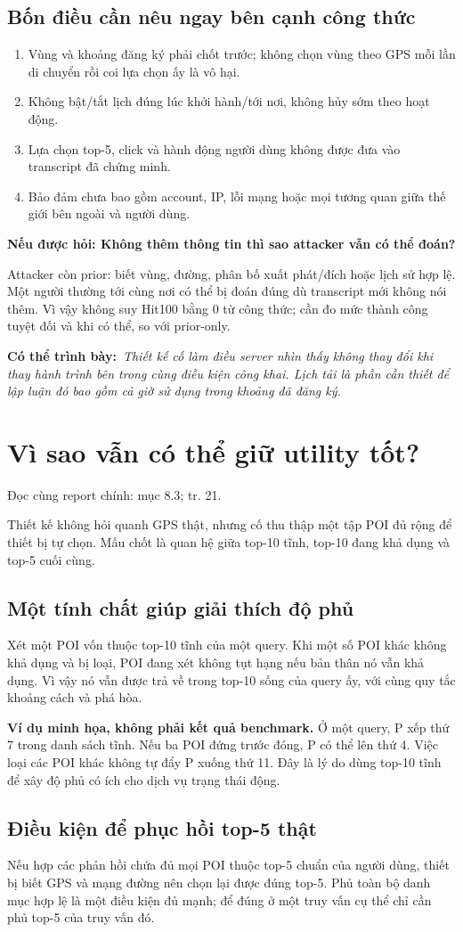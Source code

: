 \documentclass[10pt,a4paper]{article}
\newcommand{\say}[1]{\par\textbf{Có thể trình bày:}\ \textit{#1}\par}
\newcommand{\ask}[2]{\par\textbf{Nếu được hỏi: #1}\par #2\par}
\newcommand{\where}[1]{\par{\small\color{gray}Đọc cùng report chính: #1.}\par}
\newcommand{\example}{\textbf{Ví dụ minh họa, không phải kết quả benchmark.} }
\newcommand{\guidepage}[1]{\clearpage\section{#1}}
\begin{document}
\subsection*{Bốn điều cần nêu ngay bên cạnh công thức}
\begin{enumerate}
\item Vùng và khoảng đăng ký phải chốt trước; không chọn vùng theo GPS mỗi lần di chuyển rồi coi lựa chọn ấy là vô hại.
\item Không bật/tắt lịch đúng lúc khởi hành/tới nơi, không hủy sớm theo hoạt động.
\item Lựa chọn top-5, click và hành động người dùng không được đưa vào transcript đã chứng minh.
\item Bảo đảm chưa bao gồm account, IP, lỗi mạng hoặc mọi tương quan giữa thế giới bên ngoài và người dùng.
\end{enumerate}

\ask{Không thêm thông tin thì sao attacker vẫn có thể đoán?}{Attacker còn prior: biết vùng, đường, phân bố xuất phát/đích hoặc lịch sử hợp lệ. Một người thường tới cùng nơi có thể bị đoán đúng dù transcript mới không nói thêm. Vì vậy không suy Hit100 bằng 0 từ công thức; cần đo mức thành công tuyệt đối và khi có thể, so với prior-only.}
\say{Thiết kế cố làm điều server nhìn thấy không thay đổi khi thay hành trình bên trong cùng điều kiện công khai. Lịch tải là phần cần thiết để lập luận đó bao gồm cả giờ sử dụng trong khoảng đã đăng ký.}

\guidepage{Vì sao vẫn có thể giữ utility tốt?}
\where{mục 8.3; tr. 21}
Thiết kế không hỏi quanh GPS thật, nhưng cố thu thập một tập POI đủ rộng để thiết bị tự chọn. Mấu chốt là quan hệ giữa top-10 tĩnh, top-10 đang khả dụng và top-5 cuối cùng.

\subsection*{Một tính chất giúp giải thích độ phủ}
Xét một POI vốn thuộc top-10 tĩnh của một query. Khi một số POI khác không khả dụng và bị loại, POI đang xét không tụt hạng nếu bản thân nó vẫn khả dụng. Vì vậy nó vẫn được trả về trong top-10 sống của query ấy, với cùng quy tắc khoảng cách và phá hòa.

\example Ở một query, P xếp thứ 7 trong danh sách tĩnh. Nếu ba POI đứng trước đóng, P có thể lên thứ 4. Việc loại các POI khác không tự đẩy P xuống thứ 11. Đây là lý do dùng top-10 tĩnh để xây độ phủ có ích cho dịch vụ trạng thái động.

\subsection*{Điều kiện để phục hồi top-5 thật}
Nếu hợp các phản hồi chứa đủ mọi POI thuộc top-5 chuẩn của người dùng, thiết bị biết GPS và mạng đường nên chọn lại được đúng top-5. Phủ toàn bộ danh mục hợp lệ là một điều kiện đủ mạnh; để đúng ở một truy vấn cụ thể chỉ cần phủ top-5 của truy vấn đó.
\end{document}
